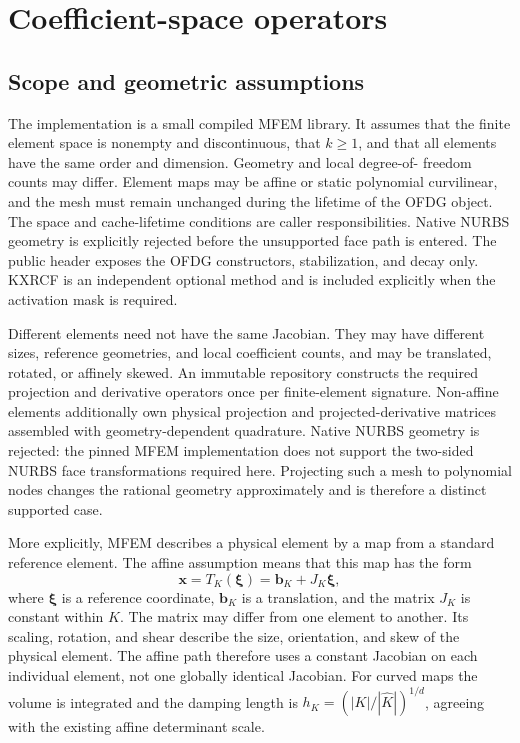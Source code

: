 \chapter{Coefficient-space operators}
\label{sec:ofdg-implementation}
\label{app:reproducibility}

\section{Scope and geometric assumptions}

The implementation is a small compiled MFEM library.  It assumes that the
finite element space is nonempty and discontinuous, that $k\geq 1$, and that
all elements have the same order and dimension.  Geometry and local degree-of-
freedom counts may differ.  Element maps may be affine or static polynomial curvilinear, and the mesh
must remain unchanged during the lifetime of the OFDG object.  The space and cache-lifetime conditions are caller responsibilities. Native NURBS geometry is explicitly rejected before the unsupported face path is entered.
The public header exposes the OFDG constructors, stabilization, and decay only.
KXRCF is an independent optional method and is included explicitly when the
activation mask is required.

Different elements need not have the same Jacobian.  They may have different
sizes, reference geometries, and local coefficient counts, and may be
translated, rotated, or affinely skewed.  An immutable repository constructs
the required projection and derivative operators once per finite-element
signature.  Non-affine elements additionally own physical projection and
projected-derivative matrices assembled with geometry-dependent quadrature.
Native NURBS geometry is rejected: the pinned MFEM implementation does not
support the two-sided NURBS face transformations required here.  Projecting such
a mesh to polynomial nodes changes the rational geometry approximately and is
therefore a distinct supported case.

More explicitly, MFEM describes a physical element by a map from a standard
reference element.  The affine assumption means that this map has the form
\begin{equation}
  \boldsymbol{x}=T_K(\boldsymbol{\xi})
  =\boldsymbol{b}_K+J_K\boldsymbol{\xi},
  \label{eq:ofdg-affine-map}
\end{equation}
where $\boldsymbol{\xi}$ is a reference coordinate, $\boldsymbol{b}_K$ is a
translation, and the matrix $J_K$ is constant within $K$.  The matrix may differ
from one element to another.  Its scaling, rotation, and shear describe the size,
orientation, and skew of the physical element.  The affine path therefore uses a constant Jacobian on each individual element,
not one globally identical Jacobian.  For curved maps the volume is integrated
and the damping length is $h_K=(|K|/|\widehat K|)^{1/d}$, agreeing with the
existing affine determinant scale.

